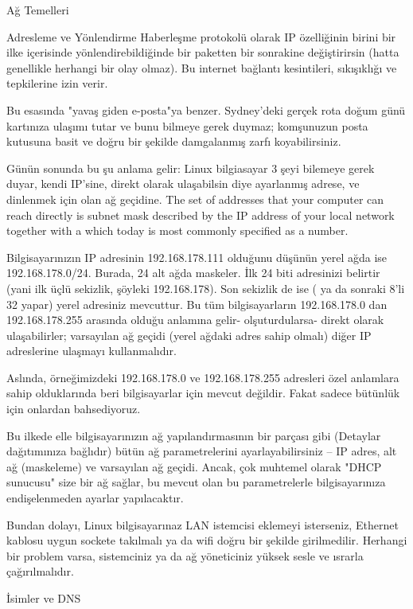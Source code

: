 \begin{section}{Ağ Temelleri}
\begin{subsection}{Adresleme ve Yönlendirme}
Haberleşme protokolü olarak IP özelliğinin birini bir ilke içerisinde yönlendirebildiğinde bir paketten bir sonrakine değiştirirsin (hatta genellikle herhangi bir olay olmaz). Bu internet bağlantı kesintileri, sıkışıklığı ve tepkilerine izin verir.

Bu esasında "yavaş giden e-posta"ya benzer. Sydney'deki gerçek rota doğum günü kartınıza ulaşımı tutar ve bunu bilmeye gerek duymaz; komşunuzun posta kutusuna basit ve doğru bir şekilde damgalanmış zarfı koyabilirsiniz.

Günün sonunda bu şu anlama gelir: Linux bilgiasayar 3 şeyi bilemeye gerek duyar, kendi IP'sine, direkt olarak ulaşabilsin diye ayarlanmış adrese, ve dinlenmek için olan ağ geçidine. The set of addresses that your computer can reach directly is subnet mask described by the IP address of your local network together with a which today is most commonly specified as a number.

Bilgisayarınızın IP adresinin 192.168.178.111 olduğunu düşünün yerel ağda ise 192.168.178.0/24. Burada, 24 alt ağda maskeler. İlk 24 biti adresinizi belirtir (yani ilk üçlü sekizlik, şöyleki 192.168.178). Son sekizlik de ise ( ya da sonraki 8'li 32 yapar) yerel adresiniz mevcuttur. Bu tüm bilgisayarların 192.168.178.0 dan 192.168.178.255 arasında olduğu anlamına gelir- olşuturdularsa- direkt olarak ulaşabilirler; varsayılan ağ geçidi (yerel ağdaki adres sahip olmalı) diğer IP adreslerine ulaşmayı kullanmalıdır. 

Aslında, örneğimizdeki 192.168.178.0 ve 192.168.178.255 adresleri özel anlamlara sahip olduklarında beri bilgisayarlar için mevcut değildir. Fakat sadece bütünlük için onlardan bahsediyoruz.

Bu ilkede elle bilgisayarınızın ağ yapılandırmasının bir parçası gibi (Detaylar dağıtımınıza bağlıdır) bütün ağ parametrelerini ayarlayabilirsiniz -- IP adres, alt ağ (maskeleme) ve varsayılan ağ geçidi. Ancak, çok muhtemel olarak "DHCP sunucusu" size bir ağ sağlar, bu mevcut olan bu parametrelerle bilgisayarınıza endişelenmeden ayarlar yapılacaktır.

Bundan dolayı, Linux bilgisayarınaz LAN istemcisi eklemeyi isterseniz, Ethernet kablosu uygun sockete takılmalı ya da wifi doğru bir şekilde girilmedilir. Herhangi bir problem varsa, sistemciniz ya da ağ yöneticiniz yüksek sesle ve ısrarla çağırılmalıdır.

\end{subsection}
\begin{subsection}{İsimler ve DNS}


\end{subsection}
\end{section}

